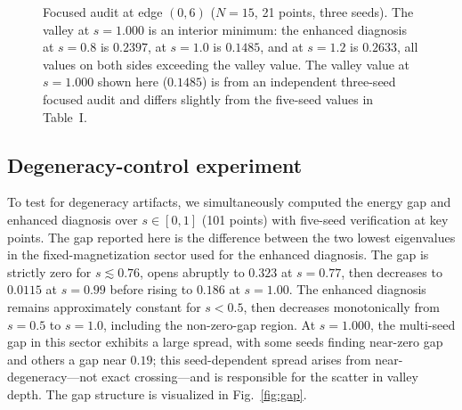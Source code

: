 \documentclass[aps,prb,reprint,superscriptaddress]{revtex4-2}
\begin{document}
\begin{figure}[t]
\centering
{}
\caption{Focused audit at edge $(0,6)$ ($N=15$, 21 points, three seeds). The valley at $s=1.000$ is an interior minimum: the enhanced diagnosis at $s=0.8$ is $0.2397$, at $s=1.0$ is $0.1485$, and at $s=1.2$ is $0.2633$, all values on both sides exceeding the valley value. The valley value at $s=1.000$ shown here ($0.1485$) is from an independent three-seed focused audit and differs slightly from the five-seed values in Table~I.}
\label{fig:focused}
\end{figure}

\subsection{Degeneracy-control experiment}

To test for degeneracy artifacts, we simultaneously computed the energy gap and enhanced diagnosis over $s\in[0,1]$ (101 points) with five-seed verification at key points. The gap reported here is the difference between the two lowest eigenvalues in the fixed-magnetization sector used for the enhanced diagnosis. The gap is strictly zero for $s\lesssim0.76$, opens abruptly to $0.323$ at $s=0.77$, then decreases to $0.0115$ at $s=0.99$ before rising to $0.186$ at $s=1.00$. The enhanced diagnosis remains approximately constant for $s<0.5$, then decreases monotonically from $s=0.5$ to $s=1.0$, including the non-zero-gap region. At $s=1.000$, the multi-seed gap in this sector exhibits a large spread, with some seeds finding near-zero gap and others a gap near $0.19$; this seed-dependent spread arises from near-degeneracy---not exact crossing---and is responsible for the scatter in valley depth. The gap structure is visualized in Fig.~\ref{fig:gap}.
\end{document}
